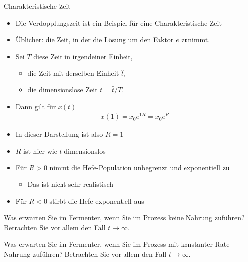 \begin{frame}{Charakteristische Zeit}
  \begin{itemize}
  \item Die Verdopplungszeit ist ein Beispiel für eine Charakteristische Zeit
  \item Üblicher: die Zeit, in der die Lösung um den Faktor $e$ zunimmt.
  \item Sei $T$ diese Zeit in irgendeiner Einheit,
    \begin{itemize}
    \item die Zeit mit derselben Einheit $\hat t$,
    \item die dimensionslose Zeit $t= \hat t/T$.
    \end{itemize}
    \pause
  \item Dann gilt für $x(t)$
    \begin{gather*}
      x(1) = x_0 e^{1R} = x_0 e^{R}
    \end{gather*}
    \pause
  \item In dieser Darstellung ist also $R=1$
  \item $R$ ist hier wie $t$ dimensionslos
  \end{itemize}
\end{frame}


\begin{frame}
  \pause
  \begin{itemize}
  \item<+-> Für $R>0$ nimmt die Hefe-Population unbegrenzt und exponentiell zu
    \begin{itemize}
    \item Das ist nicht sehr realistisch
    \end{itemize}
  \item<+-> Für $R<0$ stirbt die Hefe exponentiell aus
  \end{itemize}
\end{frame}

\begin{frame}
  \begin{Denkpause}
    Was erwarten Sie im Fermenter, wenn Sie im Prozess keine Nahrung
    zuführen? Betrachten Sie vor allem den Fall $t\to\infty$.
  \end{Denkpause}

  \begin{Denkpause}
    Was erwarten Sie im Fermenter, wenn Sie im Prozess mit konstanter
    Rate Nahrung zuführen? Betrachten Sie vor allem den Fall
    $t\to\infty$.
  \end{Denkpause}
\end{frame}

